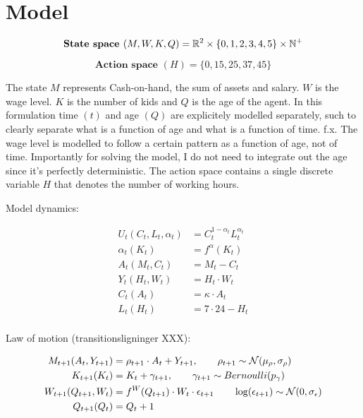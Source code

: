 \section{Model}

\begin{equation}
    \textbf{State space } (M, W, K, Q) = \mathbb{R}^{2} \times \{0, 1, 2, 3, 4, 5\} \times \mathbb{N}^{+}
\end{equation}

\begin{equation}
    \textbf{Action space } (H) = \{0, 15, 25, 37, 45\}
\end{equation}

The state $M$ represents Cash-on-hand, the sum of assets and salary. $W$ is the wage level. $K$ is the number of kids and $Q$ is the age of the agent. In this formulation time $(t)$ and age $(Q)$ are explicitely modelled separately, such to clearly separate what is a function of age and what is a function of time. f.x. The wage level is modelled to follow a certain pattern as a function of age, not of time. Importantly for solving the model, I do not need to integrate out the age since it's perfectly deterministic. The action space contains a single discrete variable $H$ that denotes the number of working hours.


Model dynamics:

\begin{align}
    U_t (C_t, L_t, \alpha_t) &= C_t^{1-\alpha_t}L_t^{\alpha_t} \label{eq:utility_v1}\\
    \alpha_t (K_t) &= f^{\alpha}(K_t) \label{eq:alpha_v1}\\
    A_t (M_t, C_t) &= M_t - C_t \label{eq:assets_v1}\\
    Y_t ( H_t, W_t) &= H_t \cdot W_t \label{eq:salary_v1}\\
    C_t (A_t) &= \kappa \cdot A_t \label{eq:consumption_v1}\\
    L_t(H_t) &= 7 \cdot 24 - H_t \label{eq:leisure_v1}\\
\end{align}

Law of motion (transitionsligninger XXX):

\begin{align}
    M_{t+1}(A_t, Y_{t+1}) &= \rho_{t+1} \cdot A_t + Y_{t+1}, \qquad \rho_{t+1} \sim \mathcal{N}(\mu_{\rho}, \sigma_{\rho}) \label{eq:cash_on_hand_v1} \\
    K_{t+1} (K_t) &= K_t + \gamma_{t+1}, \qquad \gamma_{t+1} \sim Bernoulli(p_{\gamma}) \label{eq:kids_v1}\\
    W_{t+1} (Q_{t+1}, W_{t}) &= f^{W}(Q_{t+1}) \cdot W_t \cdot \epsilon_{t+1} \qquad \log (\epsilon_{t+1} ) \sim \mathcal{N}(0, \sigma_{\epsilon}) \label{eq:wage_v1}\\
    Q_{t+1} (Q_t)&= Q_t + 1 \label{eq:age_v1}
\end{align}

